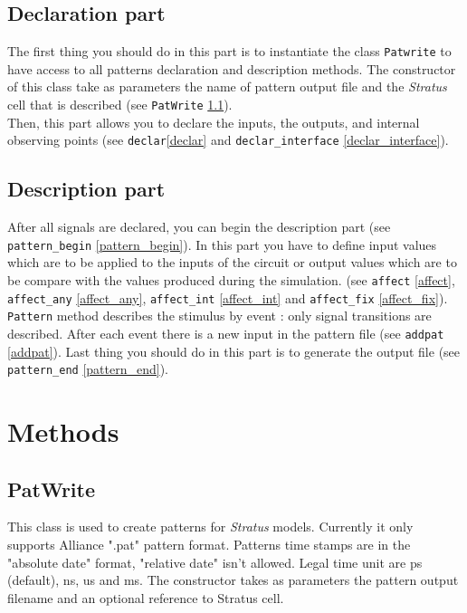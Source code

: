 \documentclass[12pt]{article}
\begin{document}
\subsection{Declaration part}
The  first  thing  you  should do in this part is to instantiate the class
\verb-Patwrite- to have access to all patterns declaration and description 
methods. The constructor of this class take as parameters the name of pattern
output file and the \emph{Stratus} cell that is described (see \verb-PatWrite-
\ref{patwrite}).\\
Then, this part allows you to declare the inputs, the outputs, and internal 
observing points (see \verb-declar-\ref{declar} and \verb-declar_interface- 
\ref{declar_interface}).

\subsection{Description part}
After all signals are declared, you can begin the description part (see
\verb-pattern_begin- \ref{pattern_begin}). In this part you have to define 
input values which are to be applied to the inputs of the circuit or output 
values which are to be compare with the values produced during the simulation. 
(see \verb-affect- \ref{affect}, \verb-affect_any- \ref{affect_any}, 
\verb-affect_int- \ref{affect_int} and \verb-affect_fix- \ref{affect_fix}).
\verb-Pattern- method describes the stimulus by event : only signal transitions 
are described. After each event there is a new input in the pattern file (see
\verb-addpat- \ref{addpat}). Last thing you should do in this part is to 
generate the output file (see \verb-pattern_end- \ref{pattern_end}).

\section{Methods}
\subsection{PatWrite}
\label{patwrite}
This class is used to create patterns for \emph{Stratus} models. Currently
it only supports Alliance ".pat" pattern format. Patterns time stamps are in 
the "absolute date" format, "relative date" isn't allowed. Legal time unit are 
ps (default), ns, us and ms. The constructor takes as parameters the pattern 
output filename and an optional reference to Stratus cell.
\end{document}
